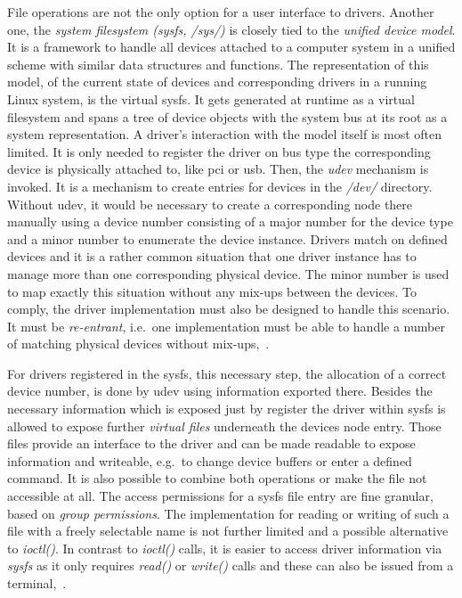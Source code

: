 File operations are not the only option for a user interface to drivers.
Another one, the \textit{system filesystem (sysfs, /sys/)} is closely tied to the \textit{unified device model}.
It is a framework to handle all devices attached to a computer system in a unified scheme with similar data structures and functions.
The representation of this model, of the current state of devices and corresponding drivers in a running Linux system, is the virtual sysfs.
It gets generated at runtime as a virtual filesystem and spans a tree of device objects with the system bus at its root as a system representation.
A driver's interaction with the model itself is most often limited.
It is only needed to register the driver on bus type the corresponding device is physically attached to, like \ac{pci} or \ac{usb}.
Then, the \textit{udev} mechanism is invoked.
It is a mechanism to create entries for devices in the \textit{/dev/} directory.
Without udev, it would be necessary to create a corresponding node there manually using a device number consisting of a major number for the device type and a minor number to enumerate the device instance.
Drivers match on defined devices and it is a rather common situation that one driver instance has to manage more than one corresponding physical device.
The minor number is used to map exactly this situation without any mix-ups between the devices.
To comply, the driver implementation must also be designed to handle this scenario.
It must be \textit{re-entrant}, i.e.\ one implementation must be able to handle a number of matching physical devices without mix-ups\cite{lfd430},~\cite{quade2016Linux}.

For drivers registered in the sysfs, this necessary step, the allocation of a correct device number, is done by udev using information exported there.
Besides the necessary information which is exposed just by register the driver within sysfs is allowed to expose further \textit{virtual files} underneath the devices node entry.
Those files provide an interface to the driver and can be made readable to expose information and writeable, e.g.\ to change device buffers or enter a defined command.
It is also possible to combine both operations or make the file not accessible at all.
The access permissions for a sysfs file entry are fine granular, based on \textit{group permissions}.
The implementation for reading or writing of such a file with a freely selectable name is not further limited and a possible alternative to \textit{ioctl()}.
In contrast to \textit{ioctl()} calls, it is easier to access driver information via \textit{sysfs} as it only requires \textit{read()} or \textit{write()} calls and these can also be issued from a terminal\cite{lfd430},~\cite{quade2016Linux}.


